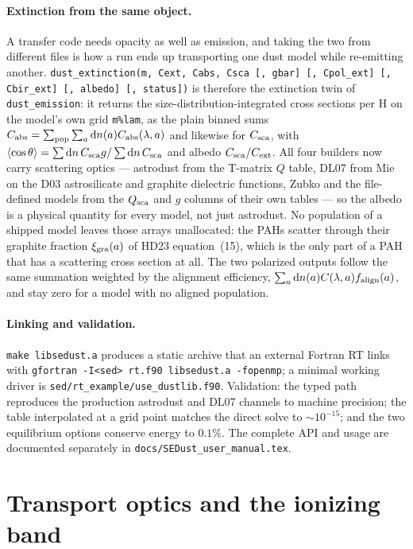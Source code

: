 \documentclass{my_memo}
\begin{document}
\paragraph{Extinction from the same object.} A transfer code needs
opacity as well as emission, and taking the two from different files is
how a run ends up transporting one dust model while re-emitting
another. \texttt{dust\_extinction(m, Cext, Cabs, Csca [, gbar]
[, Cpol\_ext] [, Cbir\_ext] [, albedo] [, status])} is therefore the
extinction twin of \texttt{dust\_emission}: it returns the
size-distribution-integrated cross sections per H on the model's own
grid \texttt{m\%lam}, as the plain binned sums
$C_{\rm abs} = \sum_{\rm pop}\sum_a {\rm d}n(a) C_{\rm abs}(\lambda,a)$
and likewise for $C_{\rm sca}$, with
$\langle\cos\theta\rangle = \sum {\rm d}n\,C_{\rm sca}g / \sum {\rm
d}n\,C_{\rm sca}$ and albedo $C_{\rm sca}/C_{\rm ext}$. All four
builders now carry scattering optics --- astrodust from the T-matrix
$Q$ table, DL07 from Mie on the D03 astrosilicate and graphite
dielectric functions, Zubko and the file-defined models from the
$Q_{\rm sca}$ and $g$ columns of their own tables --- so the albedo is
a physical quantity for every model, not just astrodust. No population of a shipped model leaves those
arrays unallocated: the PAHs scatter through their graphite fraction
$\xi_{\rm gra}(a)$ of HD23 equation~(15), which is the only part of a
PAH that has a scattering cross section at all. The two polarized outputs follow the same summation weighted by
the alignment efficiency, $\sum_a {\rm d}n(a) C(\lambda,a)
f_{\rm align}(a)$, and stay zero for a model with no aligned
population.

\paragraph{Linking and validation.} \texttt{make libsedust.a} produces a
static archive that an external Fortran RT links with
\texttt{gfortran -I<sed> rt.f90 libsedust.a -fopenmp}; a minimal working
driver is \texttt{sed/rt\_example/use\_dustlib.f90}. Validation: the typed path
reproduces the production astrodust and DL07 channels to machine
precision; the table interpolated at a grid point matches the direct
solve to $\sim 10^{-15}$; and the two equilibrium options conserve
energy to $0.1\%$. The complete API and usage are documented separately
in \texttt{docs/SEDust\_user\_manual.tex}.

\section{Transport optics and the ionizing band}
\label{sec:euv}
\end{document}
